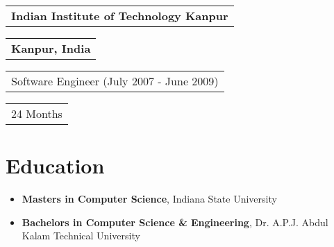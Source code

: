 \documentclass[letterpaper,11pt]{article}
\begin{document}

    \vspace{0.25cm}
    \noindent
    \begin{tabular}[t]{@{}l}
    \textbf{\color{darkgray}Indian Institute of Technology Kanpur}
    \end{tabular}
    \hfill
    \begin{tabular}[t]{l@{}}
    \textbf{\color{darkgray}Kanpur, India}
    \end{tabular}
    \noindent\newline
    \begin{tabular}[t]{@{}l}
    Software Engineer (July 2007 - June 2009)
    \end{tabular}
    \hfill
    \begin{tabular}[t]{l@{}}
    24 Months
    \end{tabular}
    
    \section{Education}
    \begin{itemize}
    	\item \textbf{\color{darkgray}Masters in Computer Science}, Indiana State University
    	\item \textbf{\color{darkgray}Bachelors in Computer Science \& Engineering}, Dr. A.P.J. Abdul Kalam Technical University
    \end{itemize}
    
    
    
\end{document}
